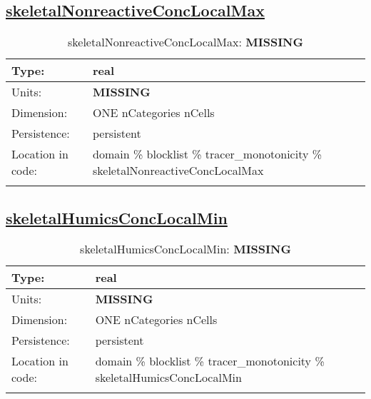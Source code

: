 \subsection[skeletalNonreactiveConcLocalMax]{\hyperref[sec:var_tab_tracer_monotonicity]{skeletalNonreactiveConcLocalMax}}
\label{subsec:var_sec_tracer_monotonicity_skeletalNonreactiveConcLocalMax}
\begin{center}
\begin{longtable}{| p{2.0in} | p{4.0in} |}
        \hline 
        Type: & real \\
        \hline 
        Units: & {\bf \color{red} MISSING} \\
        \hline 
        Dimension: & ONE nCategories nCells \\
        \hline 
        Persistence: & persistent \\
        \hline 
         Location in code: & domain \% blocklist \% tracer\_monotonicity \% skeletalNonreactiveConcLocalMax \\
         \hline 
    \caption{skeletalNonreactiveConcLocalMax: {\bf \color{red} MISSING}}
\end{longtable}
\end{center}
\subsection[skeletalHumicsConcLocalMin]{\hyperref[sec:var_tab_tracer_monotonicity]{skeletalHumicsConcLocalMin}}
\label{subsec:var_sec_tracer_monotonicity_skeletalHumicsConcLocalMin}
\begin{center}
\begin{longtable}{| p{2.0in} | p{4.0in} |}
        \hline 
        Type: & real \\
        \hline 
        Units: & {\bf \color{red} MISSING} \\
        \hline 
        Dimension: & ONE nCategories nCells \\
        \hline 
        Persistence: & persistent \\
        \hline 
         Location in code: & domain \% blocklist \% tracer\_monotonicity \% skeletalHumicsConcLocalMin \\
         \hline 
    \caption{skeletalHumicsConcLocalMin: {\bf \color{red} MISSING}}
\end{longtable}
\end{center}
